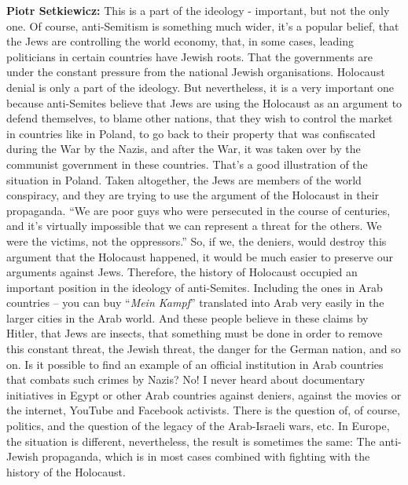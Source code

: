\textbf{Piotr Setkiewicz:} This is a part of the ideology - important, but not the only one. Of course, anti-Semitism is something much wider, it’s a popular belief, that the Jews are controlling the world economy, that, in some cases, leading politicians in certain countries have Jewish roots. That the governments are under the constant pressure from the national Jewish organisations. Holocaust denial is only a part of the ideology. But nevertheless, it is a very important one because anti-Semites believe that Jews are using the Holocaust as an argument to defend themselves, to blame other nations, that they wish to control the market in countries like in Poland, to go back to their property that was confiscated during the War by the Nazis, and after the War, it was taken over by the communist government in these countries. That’s a good illustration of the situation in Poland. Taken altogether, the Jews are members of the world conspiracy, and they are trying to use the argument of the Holocaust in their propaganda. ``We are poor guys who were persecuted in the course of centuries, and it’s virtually impossible that we can represent a threat for the others. We were the victims, not the oppressors.'' So, if we, the deniers, would destroy this argument that the Holocaust happened, it would be much easier to preserve our arguments against Jews. Therefore, the history of Holocaust occupied an important position in the ideology of anti-Semites. Including the ones in Arab countries – you can buy ``\textit{Mein Kampf}'' translated into Arab very easily in the larger cities in the Arab world. And these people believe in these claims by Hitler, that Jews are insects, that something must be done in order to remove this constant threat, the Jewish threat, the danger for the German nation, and so on. Is it possible to find an example of an official institution in Arab countries that combats such crimes by Nazis? No! I never heard about documentary initiatives in Egypt or other Arab countries against deniers, against the movies or the internet, YouTube and Facebook activists. There is the question of, of course, politics, and the question of the legacy of the Arab-Israeli wars, etc. In Europe, the situation is different, nevertheless, the result is sometimes the same: The anti-Jewish propaganda, which is in most cases combined with fighting with the history of the Holocaust.\\ 
